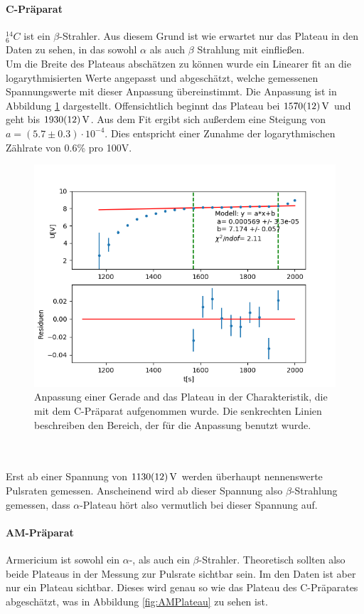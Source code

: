 \documentclass[12pt,a4paper]{article}
\begin{document}
\paragraph{C-Präparat}
$_6^{14} C$ ist ein $\beta$-Strahler. Aus diesem Grund ist wie erwartet nur das Plateau in den Daten zu sehen, in das sowohl $\alpha$ als auch $\beta$ Strahlung mit einfließen.\\
Um die Breite des Plateaus abschätzen zu können wurde ein Linearer fit an die logarythmisierten Werte angepasst und abgeschätzt, welche gemessenen Spannungswerte  mit dieser Anpassung übereinstimmt. Die Anpassung ist in Abbildung \ref{fig:CPlateau} dargestellt. Offensichtlich beginnt das Plateau bei $\SI{1570\pm 12}{V}$ und geht bis $\SI{1930\pm 12}{V}$. Aus dem Fit ergibt sich außerdem eine Steigung von $a = (5.7\pm0.3)\cdot 10^{-4}$. Dies entspricht einer Zunahme der logarythmischen Zählrate von 0.6\% pro 100V.
\begin{figure}
\centering
\includegraphics[scale=0.8]{Bilder/Prop/C_plateau.PNG}
\caption{Anpassung einer Gerade and das Plateau in der Charakteristik, die mit dem C-Präparat aufgenommen wurde. Die senkrechten Linien beschreiben den Bereich, der für die Anpassung benutzt wurde.}
\label{fig:CPlateau}
\end{figure}\\
\\
Erst ab einer Spannung von $\SI{1130\pm 12}{V}$ werden überhaupt nennenswerte Pulsraten gemessen. Anscheinend wird ab dieser Spannung also $\beta$-Strahlung gemessen, dass $\alpha$-Plateau hört also vermutlich bei dieser Spannung auf.

\paragraph{AM-Präparat}
Armericium ist sowohl ein $\alpha$-, als auch ein $\beta$-Strahler. Theoretisch sollten also beide Plateaus in der Messung zur Pulsrate sichtbar sein. Im den Daten ist aber nur ein Plateau sichtbar. Dieses wird genau so wie das Plateau des C-Präparates abgeschätzt, was in Abbildung \ref{fig:AMPlateau} zu sehen ist.
\end{document}
